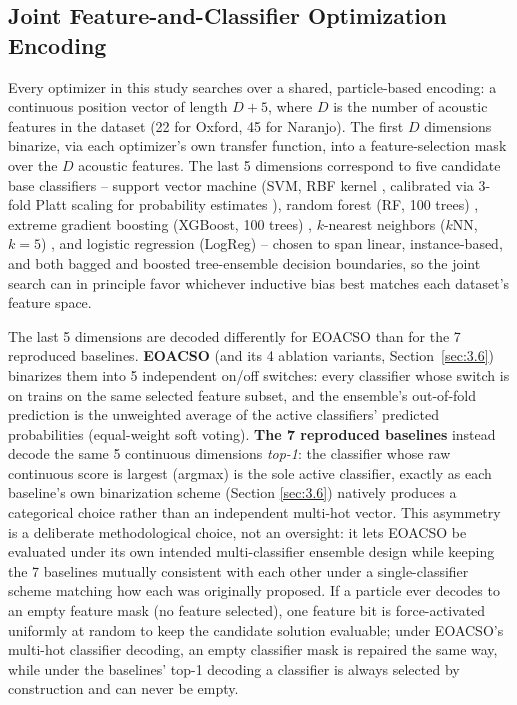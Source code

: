 \subsection{Joint Feature-and-Classifier Optimization Encoding}
\label{sec:3.3}

Every optimizer in this study searches over a shared, particle-based
encoding: a continuous position vector of length $D + 5$, where $D$ is
the number of acoustic features in the dataset (22 for Oxford, 45 for
Naranjo). The first $D$ dimensions binarize, via each optimizer's own
transfer function, into a feature-selection mask over the $D$ acoustic
features. The last 5 dimensions correspond to five candidate base
classifiers -- support vector machine (SVM, RBF kernel \cite{Cortes:1995},
calibrated via 3-fold Platt scaling for probability estimates
\cite{Platt:1999}), random forest (RF, 100 trees) \cite{Breiman:2001},
extreme gradient boosting (XGBoost, 100 trees) \cite{Chen:2016},
$k$-nearest neighbors ($k$NN, $k=5$) \cite{Cover:1967}, and logistic
regression (LogReg) -- chosen to span linear, instance-based, and both
bagged and boosted tree-ensemble decision boundaries, so the joint search
can in principle favor whichever inductive bias best matches each
dataset's feature space.

The last 5 dimensions are decoded differently for EOACSO than for the 7
reproduced baselines. \textbf{EOACSO} (and its 4 ablation variants,
Section~\ref{sec:3.6}) binarizes them into 5 independent
on/off switches: every classifier whose switch is on trains on the same
selected feature subset, and the ensemble's out-of-fold prediction is the
unweighted average of the active classifiers' predicted probabilities
(equal-weight soft voting). \textbf{The 7 reproduced baselines} instead
decode the same 5 continuous dimensions \emph{top-1}: the classifier
whose raw continuous score is largest (argmax) is the sole active
classifier, exactly as each baseline's own binarization scheme (Section
\ref{sec:3.6}) natively produces a categorical choice
rather than an independent multi-hot vector. This asymmetry is a
deliberate methodological choice, not an oversight: it lets EOACSO be
evaluated under its own intended multi-classifier ensemble design while
keeping the 7 baselines mutually consistent with each other under a
single-classifier scheme matching how each was originally proposed. If a
particle ever decodes to an empty feature mask (no feature selected), one
feature bit is force-activated uniformly at random to keep the candidate
solution evaluable; under EOACSO's multi-hot classifier decoding, an
empty classifier mask is repaired the same way, while under the
baselines' top-1 decoding a classifier is always selected by construction
and can never be empty.

